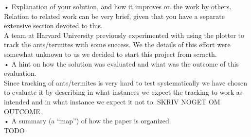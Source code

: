 • Explanation of your solution, and how it improves on the work by others. Relation to related work can be very brief, given that you have a separate extensive section devoted to this. \\
A team at Harvard University previously experimented with using the plotter to track the ants/termites with some success. We the details of this effort were somewhat unknown to us we decided to start this project from scracth. \\

• A hint on how the solution was evaluated and what was the outcome of this evaluation. \\
Since tracking of ants/termites is very hard to test systematically we have chosen to evaluate it by describing in what instances we expect the tracking to work as intended and in what instance we expect it not to. SKRIV NOGET OM OUTCOME. \\

• A summary (a “map”) of how the paper is organized.\\
TODO \\


